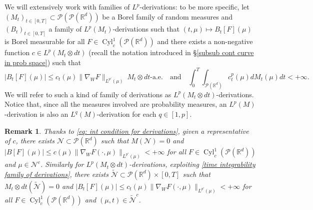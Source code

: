 \documentclass[10pt,leqno]{amsart}
\numberwithin{equation}{section}
\newtheorem{oss}[teorema]{Remark}
\newcommand{\R}{\mathbb{R}}
\newcommand{\PP}{\mathcal{P}}
\begin{document}
We will extensively work with families of $L^p$-derivations: to be more specific, let $(M_t)_{t\in [0,T]}\subset \PP(\PP(\R^d))$ be a Borel family of random measures and $(B_t)_{t\in [0,T]}$ a family of $L^p(M_t)$-derivations such that $(t,\mu)\mapsto B_t[F](\mu)$ is Borel measurable for all $F\in \operatorname{Cyl}_c^1(\PP(\R^d))$ and there exists a non-negative function $c\in L^p(M_t\otimes dt)$ (recall the notation introduced in §\ref{subsub cont curve in prob space}) such that
\begin{equation}\label{time integrability family of derivations}
    |B_t[F](\mu)| \leq c_t(\mu) \|\nabla_W F\|_{L^{p'}(\mu)} \  M_t\otimes dt\text{-a.e.} \quad \text{and} \quad \int_0^T \int_{\PP(\R^d)} c_t^p(\mu)dM_t(\mu) dt <+\infty.
\end{equation}
We will refer to such a kind of family of derivations as $L^p(M_t\otimes dt)$-derivations. Notice that, since all the measures involved are probability measures, an $L^p(M)$-derivation is also an $L^q(M)$-derivation for each $q\in[1,p]$.


\begin{oss}\label{rem: negligible sets derivation}
    Thanks to \eqref{eq: int condition for derivations}, given a representative of $c$, there exists $\mathcal{N}\subset \PP(\R^d)$ such that $M(\mathcal{N}) = 0$ and $|B[F](\mu)|\leq c(\mu) \|\nabla_WF(\cdot,\mu)\|_{L^{p'}(\mu)}< +\infty$ for all $F \in \operatorname{Cyl}_c^1(\PP(\R^d))$ and $\mu\in\mathcal{N}^c$. 
    Similarly for $L^p(M_t\otimes dt)$-derivations, exploiting \eqref{time integrability family of derivations}, there exists $\widetilde{\mathcal{N}}\subset \PP(\R^d)\times [0,T]$ such that $M_t\otimes dt(\widetilde{\mathcal{N}}) = 0$ and $|B_t[F](\mu)|\leq c_t(\mu) \|\nabla_WF(\cdot,\mu)\|_{L^{p'}(\mu)}<+\infty$ for all $F \in \operatorname{Cyl}_c^1(\PP(\R^d))$ and $(\mu,t)\in\widetilde{\mathcal{N}}^c$. 
\end{oss}
\end{document}
